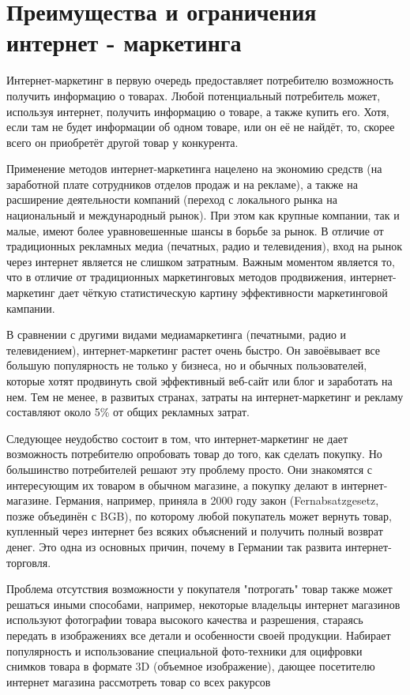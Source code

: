 \documentclass[a4paper,english,russian]{G2-105}
\begin{document}
\section{Преимущества и ограничения интернет - маркетинга}
\par Интернет-маркетинг в первую очередь предоставляет потребителю возможность получить информацию о товарах. Любой потенциальный потребитель может, используя интернет, получить информацию о товаре, а также купить его. Хотя, если там не будет информации об одном товаре, или он её не найдёт, то, скорее всего он приобретёт другой товар у конкурента.
\par Применение методов интернет-маркетинга нацелено на экономию средств (на заработной плате сотрудников отделов продаж и на рекламе), а также на расширение деятельности компаний (переход с локального рынка на национальный и международный рынок). При этом как крупные компании, так и малые, имеют более уравновешенные шансы в борьбе за рынок. В отличие от традиционных рекламных медиа (печатных, радио и телевидения), вход на рынок через интернет является не слишком затратным. Важным моментом является то, что в отличие от традиционных маркетинговых методов продвижения, интернет-маркетинг дает чёткую статистическую картину эффективности маркетинговой кампании.
\par В сравнении с другими видами медиамаркетинга (печатными, радио и телевидением), интернет-маркетинг растет очень быстро. Он завоёвывает все большую популярность не только у бизнеса, но и обычных пользователей, которые хотят продвинуть свой эффективный веб-сайт или блог и заработать на нем. Тем не менее, в развитых странах, затраты на интернет-маркетинг и рекламу составляют около 5\% от общих рекламных затрат.
\par Следующее неудобство состоит в том, что интернет-маркетинг не дает возможность потребителю опробовать товар до того, как сделать покупку. Но большинство потребителей решают эту проблему просто. Они знакомятся с интересующим их товаром в обычном магазине, а покупку делают в интернет-магазине. Германия, например, приняла в 2000 году закон (Fernabsatzgesetz, позже объединён с BGB), по которому любой покупатель может вернуть товар, купленный через интернет без всяких объяснений и получить полный возврат денег. Это одна из основных причин, почему в Германии так развита интернет-торговля.
\par Проблема отсутствия возможности у покупателя "потрогать" товар также может решаться иными способами, например, некоторые владельцы интернет магазинов используют фотографии товара высокого качества и разрешения, стараясь передать в изображениях все детали и особенности своей продукции. Набирает популярность и использование специальной фото-техники для оцифровки снимков товара в формате 3D (объемное изображение), дающее посетителю интернет магазина рассмотреть товар со всех ракурсов
\end{document}
